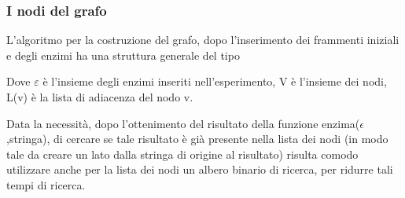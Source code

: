 \documentclass[a4paper,10pt]{article}
\begin{document}
\subsubsection{I nodi del grafo}\label{sec:nodi}
L'algoritmo per la costruzione del grafo, dopo l'inserimento dei frammenti iniziali e degli enzimi ha una struttura generale del tipo

\begin{algorithm}[H]
\end{algorithm}
Dove $\varepsilon$ è l'insieme degli enzimi inseriti nell'esperimento, V è l'insieme dei nodi, L(v) è la lista di adiacenza del nodo v.

Data la necessità, dopo l'ottenimento del risultato della funzione enzima($\epsilon$,stringa), di cercare se tale risultato è già presente nella lista dei nodi (in modo tale da creare un lato dalla stringa di origine al risultato) risulta comodo utilizzare anche per la lista dei nodi un albero binario di ricerca, per ridurre tali tempi di ricerca.
\end{document}
